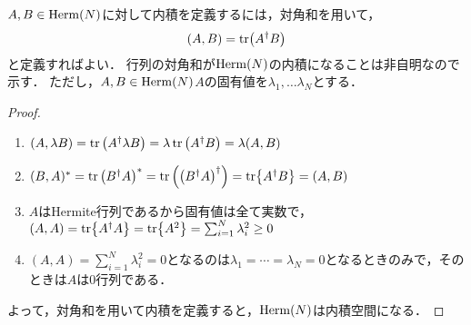 \documentclass{report}
\begin{document}
    $A, B\in \mathrm{Herm}(N)$に対して内積を定義するには，対角和を用いて，
    \begin{align}
      (A, B) = \tr(A^{\dag}B)
    \end{align}
    と定義すればよい．
    行列の対角和が$\mathrm{Herm}(N)$の内積になることは非自明なので示す．
    ただし，$A, B\in \mathrm{Herm}(N)$$A$の固有値を$\lambda_1, \dots \lambda_N$とする．
    \begin{proof}
      \begin{enumerate}
        \item $(A, \lambda B) = \tr\qty(A^{\dag}\lambda B) = \lambda\tr\qty(A^{\dag}B) = \lambda(A, B)$
        \item $(B, A)^* = \tr\qty(B^{\dag}A)^* = \tr\qty(\qty(B^{\dag}A)^{\dag}) = \tr{A^{\dag}B} = (A, B)$
        \item $A$はHermite行列であるから固有値は全て実数で，$(A, A) = \tr{A^{\dag}A} = \tr{A^2} = \sum_{i = 1}^{N}\lambda^2_i \geq 0$
        \item $(A, A) = \sum_{i = 1}^{N}\lambda^2_i = 0$となるのは$\lambda_1 = \cdots = \lambda_N = 0$となるときのみで，そのときは$A$は0行列である．
      \end{enumerate}
      よって，対角和を用いて内積を定義すると，$\mathrm{Herm}(N)$は内積空間になる．
    \end{proof}
\end{document}
